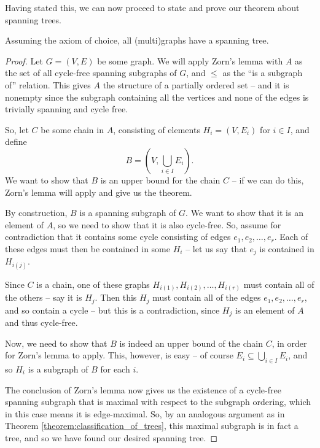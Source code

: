 \documentclass[nobib]{tufte-handout}
\begin{document}
Having stated this, we can now proceed to state and prove our theorem about spanning trees.

\begin{theorem}
  Assuming the axiom of choice, all (multi)graphs have a spanning tree.

  \begin{proof}
    Let $G = (V,E)$ be some graph. We will apply Zorn's lemma with $A$ as the set of all cycle-free spanning subgraphs of $G$, and $\leq$ as the ``is a subgraph of'' relation. This gives $A$ the structure of a partially ordered set -- and it is nonempty since the subgraph containing all the vertices and none of the edges is trivially spanning and cycle free.

    So, let $C$ be some chain in $A$, consisting of elements $H_i = (V, E_i)$ for $i \in I$, and define
    $$B = \left(V, \bigcup_{i\in I} E_i\right).$$
    We want to show that $B$ is an upper bound for the chain $C$ -- if we can do this, Zorn's lemma will apply and give us the theorem.

    By construction, $B$ is a spanning subgraph of $G$. We want to show that it is an element of $A$, so we need to show that it is also cycle-free. So, assume for contradiction that it contains some cycle consisting of edges $e_1, e_2, \ldots, e_r$. Each of these edges must then be contained in some $H_i$ -- let us say that $e_j$ is contained in $H_{i(j)}$.

    Since $C$ is a chain, one of these graphs $H_{i(1)}, H_{i(2)}, \ldots, H_{i(r)}$ must contain all of the others -- say it is $H_j$. Then this $H_j$ must contain all of the edges $e_1, e_2, \ldots, e_r$, and so contain a cycle -- but this is a contradiction, since $H_j$ is an element of $A$ and thus cycle-free.

    Now, we need to show that $B$ is indeed an upper bound of the chain $C$, in order for Zorn's lemma to apply. This, however, is easy -- of course $E_i \subseteq \bigcup_{i\in I} E_i$, and so $H_i$ is a subgraph of $B$ for each $i$.

    The conclusion of Zorn's lemma now gives us the existence of a cycle-free spanning subgraph that is maximal with respect to the subgraph ordering, which in this case means it is edge-maximal. So, by an analogous argument as in Theorem \ref{theorem:classification_of_trees}, this maximal subgraph is in fact a tree, and so we have found our desired spanning tree.
  \end{proof}
\end{theorem}
\end{document}
